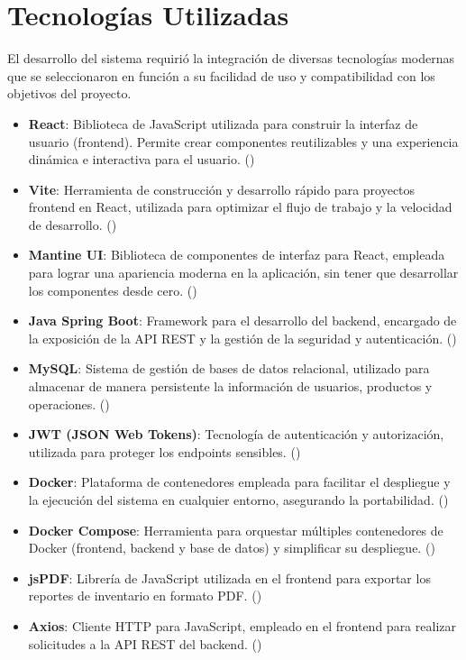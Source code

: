 \section{Tecnologías Utilizadas}

El desarrollo del sistema requirió la integración de diversas tecnologías modernas que se seleccionaron en función a su facilidad de uso y compatibilidad con los objetivos del proyecto.

\begin{itemize}
    \item \textbf{React}: Biblioteca de JavaScript utilizada para construir la interfaz de usuario (frontend). Permite crear componentes reutilizables y una experiencia dinámica e interactiva para el usuario. (\cite{react})
    \item \textbf{Vite}: Herramienta de construcción y desarrollo rápido para proyectos frontend en React, utilizada para optimizar el flujo de trabajo y la velocidad de desarrollo. (\cite{vite})
    \item \textbf{Mantine UI}: Biblioteca de componentes de interfaz para React, empleada para lograr una apariencia moderna en la aplicación, sin tener que desarrollar los componentes desde cero. (\cite{mantine})
    \item \textbf{Java Spring Boot}: Framework para el desarrollo del backend, encargado de la exposición de la API REST y la gestión de la seguridad y autenticación. (\cite{springboot})
    \item \textbf{MySQL}: Sistema de gestión de bases de datos relacional, utilizado para almacenar de manera persistente la información de usuarios, productos y operaciones. (\cite{mysql})
    \item \textbf{JWT (JSON Web Tokens)}: Tecnología de autenticación y autorización, utilizada para proteger los endpoints sensibles. (\cite{jwt})
    \item \textbf{Docker}: Plataforma de contenedores empleada para facilitar el despliegue y la ejecución del sistema en cualquier entorno, asegurando la portabilidad. (\cite{docker})
    \item \textbf{Docker Compose}: Herramienta para orquestar múltiples contenedores de Docker (frontend, backend y base de datos) y simplificar su despliegue. (\cite{dockercompose})
    \item \textbf{jsPDF}: Librería de JavaScript utilizada en el frontend para exportar los reportes de inventario en formato PDF. (\cite{jspdf})
    \item \textbf{Axios}: Cliente HTTP para JavaScript, empleado en el frontend para realizar solicitudes a la API REST del backend. (\cite{axios})
\end{itemize}


